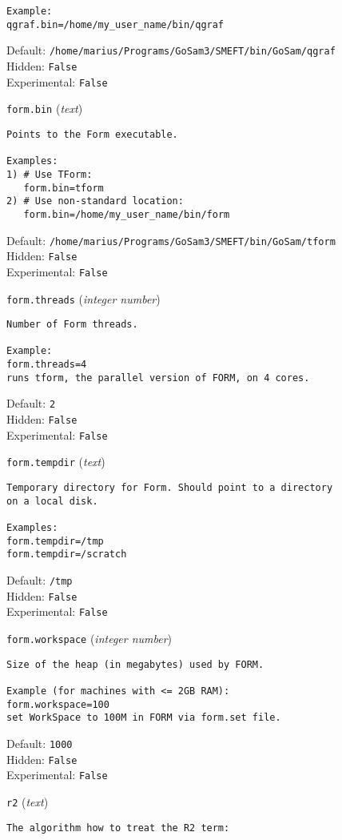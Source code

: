 \begin{basedescript}{\desclabelstyle{\pushlabel}}
\begin{verbatim}
Example:
qgraf.bin=/home/my_user_name/bin/qgraf
\end{verbatim}
Default: \verb|/home/marius/Programs/GoSam3/SMEFT/bin/GoSam/qgraf|
\\Hidden: \verb|False|
\\Experimental: \verb|False|
\\\item[\colorbox{gray!30}{\texttt{form.bin}}] (\textit{text})
\begin{verbatim}
Points to the Form executable.

Examples:
1) # Use TForm:
   form.bin=tform
2) # Use non-standard location:
   form.bin=/home/my_user_name/bin/form
\end{verbatim}
Default: \verb|/home/marius/Programs/GoSam3/SMEFT/bin/GoSam/tform|
\\Hidden: \verb|False|
\\Experimental: \verb|False|
\\\item[\colorbox{gray!30}{\texttt{form.threads}}] (\textit{integer number})
\begin{verbatim}
Number of Form threads.

Example:
form.threads=4
runs tform, the parallel version of FORM, on 4 cores.
\end{verbatim}
Default: \verb|2|
\\Hidden: \verb|False|
\\Experimental: \verb|False|
\\\item[\colorbox{gray!30}{\texttt{form.tempdir}}] (\textit{text})
\begin{verbatim}
Temporary directory for Form. Should point to a directory
on a local disk.

Examples:
form.tempdir=/tmp
form.tempdir=/scratch
\end{verbatim}
Default: \verb|/tmp|
\\Hidden: \verb|False|
\\Experimental: \verb|False|
\\\item[\colorbox{gray!30}{\texttt{form.workspace}}] (\textit{integer number})
\begin{verbatim}
Size of the heap (in megabytes) used by FORM.

Example (for machines with <= 2GB RAM):
form.workspace=100
set WorkSpace to 100M in FORM via form.set file.
\end{verbatim}
Default: \verb|1000|
\\Hidden: \verb|False|
\\Experimental: \verb|False|
\\\item[\colorbox{gray!30}{\texttt{r2}}] (\textit{text})
\begin{verbatim}
The algorithm how to treat the R2 term:


\end{verbatim}
\end{basedescript}
